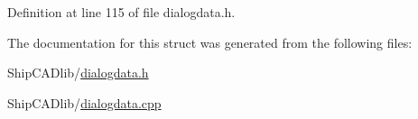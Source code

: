 Definition at line 115 of file dialogdata.\+h.



The documentation for this struct was generated from the following files\+:\begin{DoxyCompactItemize}
\item 
Ship\+C\+A\+Dlib/\hyperlink{dialogdata_8h}{dialogdata.\+h}\item 
Ship\+C\+A\+Dlib/\hyperlink{dialogdata_8cpp}{dialogdata.\+cpp}\end{DoxyCompactItemize}
